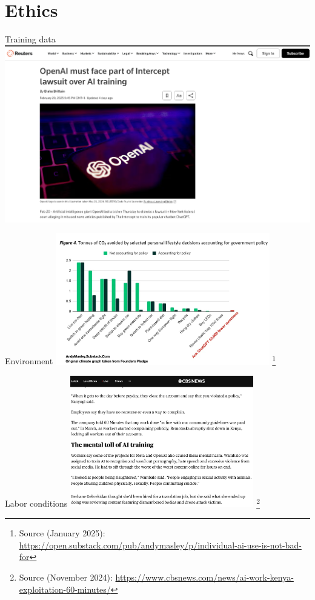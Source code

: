 \documentclass[t,xcolor={dvipsnames},final,aspectratio=169]{beamer}
\begin{document}
\section{Ethics}
\begin{frame}{Training data}
\includegraphics[width=\textwidth]{img/trainingdata.png}
\end{frame}

{
\begin{frame}{Environment}
\includegraphics[width=0.7\textwidth]{img/emissions.jpg}
\footnote{Source (January 2025): \url{https://open.substack.com/pub/andymasley/p/individual-ai-use-is-not-bad-for}}
\end{frame}
}

{
\begin{frame}{Labor conditions}
\includegraphics[width=0.6\textwidth]{img/labor.png}
\footnote{Source (November 2024): \url{https://www.cbsnews.com/news/ai-work-kenya-exploitation-60-minutes/}}
\end{frame}
}
\end{document}
